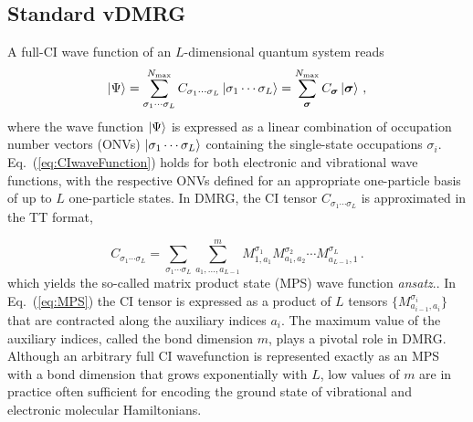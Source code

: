 \documentclass[journal=jctcce]{achemso}
\begin{document}
\subsection{Standard vDMRG}
\label{subsec:DMRG}

A full-CI wave function of an $L$-dimensional quantum system reads
\begin{equation}
  \ket{\Psi} = \sum_{\sigma_1\cdots\sigma_L}^{N_\text{max}} 
			    C_{\sigma_1\cdots\sigma_L} \ket{\sigma_1\cdots\sigma_L}
			 = \sum_{\bm{\sigma}}^{N_\text{max}} C_{\bm{\sigma}} \ket{\bm{\sigma}} \, ,
  \label{eq:CIwaveFunction}
\end{equation}
%
where the wave function $\ket{\Psi}$ is expressed as a linear combination of occupation number vectors (ONVs) $\ket{\sigma_1\cdots\sigma_L}$ containing the single-state occupations $\sigma_i$.
Eq.~(\ref{eq:CIwaveFunction}) holds for both electronic and vibrational wave functions, with the respective ONVs defined for an appropriate one-particle basis of up to $L$ one-particle states.
In DMRG, the CI tensor $C_{\sigma_1\cdots\sigma_L}$ is approximated in the TT format\cite{Oseledets2012_ALS},

\begin{equation}
  C_{\sigma_1\cdots\sigma_L}
    = \sum_{\sigma_1\cdots\sigma_L} \sum_{a_1, \dots, a_{L-1}}^m 
      M_{1, a_1}^{\sigma_1} M_{a_1, a_2}^{\sigma_2} \cdots M_{a_{L-1}, 1}^{\sigma_{L}} \, .
  \label{eq:MPS}
\end{equation}
%
which yields the so-called matrix product state (MPS) wave function \textit{ansatz}.\cite{Rommer1997_MPS-Ansatz}. In 
Eq.~(\ref{eq:MPS}) the CI tensor is expressed as a product of $L$ tensors $\{M_{a_{i-1},a_i}^{\sigma_i}\}$ that are contracted along the auxiliary indices $a_i$.
The maximum value of the auxiliary indices, called the bond dimension $m$, plays a pivotal role in DMRG.
Although an arbitrary full CI wavefunction is represented exactly as an MPS with a bond dimension that grows exponentially with $L$, low values of $m$  are in practice often sufficient for encoding the ground state of vibrational\cite{Oseledts2016,Baiardi2017_VDMRG,Baiardi2019_HighEnergy-vDMRG} and electronic\cite{Chan2002_DMRG,Legeza2003_DMRG-LiF,Marti2008_DMRGMetalComplexes} molecular Hamiltonians. 
\end{document}

